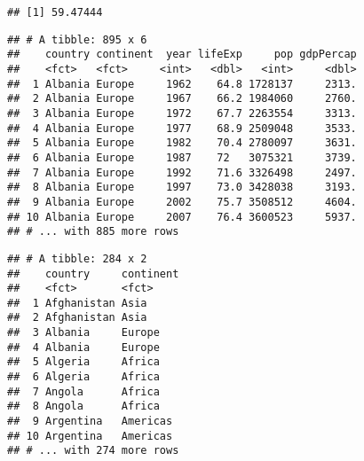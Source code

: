 \documentclass[]{article}
\newenvironment{Shaded}{\begin{snugshade}}{\end{snugshade}}
\newcommand{\DecValTok}[1]{\textcolor[rgb]{0.00,0.00,0.81}{#1}}
\newcommand{\KeywordTok}[1]{\textcolor[rgb]{0.13,0.29,0.53}{\textbf{#1}}}
\newcommand{\NormalTok}[1]{#1}
\newcommand{\OperatorTok}[1]{\textcolor[rgb]{0.81,0.36,0.00}{\textbf{#1}}}
\newcommand{\StringTok}[1]{\textcolor[rgb]{0.31,0.60,0.02}{#1}}
\begin{document}
\begin{verbatim}
## [1] 59.47444
\end{verbatim}

\begin{Shaded}
\end{Shaded}

\begin{verbatim}
## # A tibble: 895 x 6
##    country continent  year lifeExp     pop gdpPercap
##    <fct>   <fct>     <int>   <dbl>   <int>     <dbl>
##  1 Albania Europe     1962    64.8 1728137     2313.
##  2 Albania Europe     1967    66.2 1984060     2760.
##  3 Albania Europe     1972    67.7 2263554     3313.
##  4 Albania Europe     1977    68.9 2509048     3533.
##  5 Albania Europe     1982    70.4 2780097     3631.
##  6 Albania Europe     1987    72   3075321     3739.
##  7 Albania Europe     1992    71.6 3326498     2497.
##  8 Albania Europe     1997    73.0 3428038     3193.
##  9 Albania Europe     2002    75.7 3508512     4604.
## 10 Albania Europe     2007    76.4 3600523     5937.
## # ... with 885 more rows
\end{verbatim}

\begin{Shaded}
\end{Shaded}

\begin{verbatim}
## # A tibble: 284 x 2
##    country     continent
##    <fct>       <fct>    
##  1 Afghanistan Asia     
##  2 Afghanistan Asia     
##  3 Albania     Europe   
##  4 Albania     Europe   
##  5 Algeria     Africa   
##  6 Algeria     Africa   
##  7 Angola      Africa   
##  8 Angola      Africa   
##  9 Argentina   Americas 
## 10 Argentina   Americas 
## # ... with 274 more rows
\end{verbatim}

\begin{Shaded}
\end{Shaded}
\end{document}
